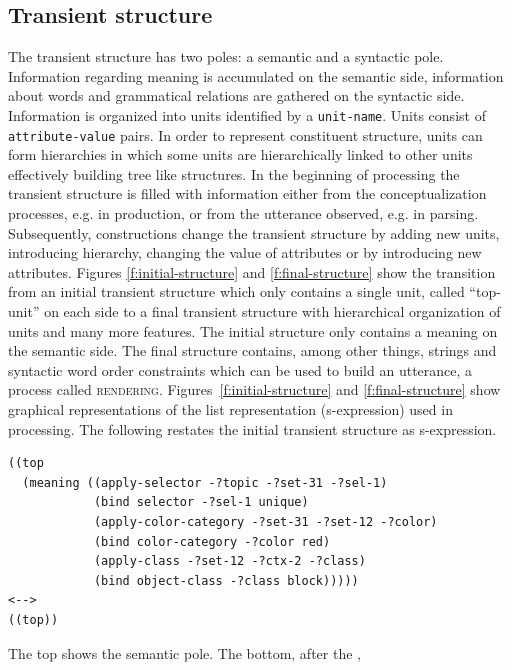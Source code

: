 \subsection{Transient structure}
The transient structure has two poles: a semantic and a syntactic pole.
Information regarding meaning is accumulated on the semantic
side, information about words and grammatical relations are
gathered on the syntactic side. Information is organized into 
units identified by a {\footnotesize\tt unit-name}. Units consist of {\footnotesize\tt attribute-value} pairs. 
In order to represent constituent structure, units can form hierarchies 
in which some units are hierarchically linked to other units effectively 
building tree like structures.
In the beginning of processing the transient structure is filled with 
information either from the conceptualization 
processes, e.g. in production, or from the utterance observed, e.g.
in parsing. Subsequently, constructions change the transient structure by adding new
units, introducing hierarchy, changing the value of attributes or by introducing 
new attributes. Figures \ref{f:initial-structure} and \ref{f:final-structure} show the transition from 
an initial transient structure which only contains a single unit, called ``top-unit'' 
on each side to a final transient structure with hierarchical organization of units 
and many more features. The initial structure only contains a 
meaning on the semantic side. The final structure contains,
among other things, strings and syntactic word order constraints 
which can be used to build an utterance, a process called \textsc{rendering}.
Figures~\ref{f:initial-structure} and \ref{f:final-structure} show graphical representations
of the list representation (s-expression) used in processing. The
following restates the initial transient structure as s-expression.
\begin{lstlisting}
((top
  (meaning ((apply-selector -?topic -?set-31 -?sel-1)
            (bind selector -?sel-1 unique)
            (apply-color-category -?set-31 -?set-12 -?color)
            (bind color-category -?color red)
            (apply-class -?set-12 -?ctx-2 -?class)
            (bind object-class -?class block)))))
<-->
((top))
\end{lstlisting}
The top shows the semantic pole. The bottom, after the {\footnotesize\tt <-->},

